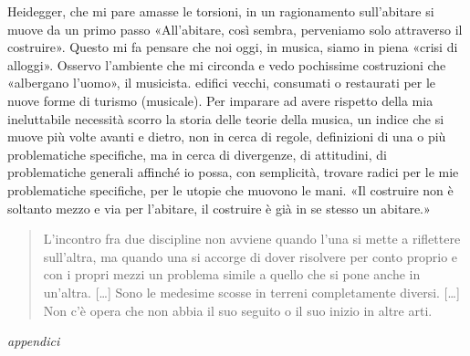 \documentclass{../../lib/gs}
\begin{document}
Heidegger, che mi pare amasse le torsioni, in un ragionamento sull'abitare
\cite{heidegger1991} si muove da un primo passo «All'abitare, così sembra,
perveniamo solo attraverso il costruire». Questo mi fa pensare che noi oggi, in
musica, siamo in piena «crisi di alloggi». Osservo l'ambiente che mi circonda e
vedo pochissime costruzioni che «albergano l'uomo», il musicista. edifici vecchi,
consumati o restaurati per le nuove forme di turismo (musicale). Per imparare
ad avere rispetto della mia ineluttabile necessità scorro la storia delle teorie
della musica, un indice che si muove più volte avanti e dietro, non in cerca di
regole, definizioni di una o più problematiche specifiche, ma in cerca di
divergenze, di attitudini, di problematiche generali affinché io possa, con
semplicità, trovare radici per le mie problematiche specifiche, per le utopie
che muovono le mani. «Il costruire non è soltanto mezzo e via per l'abitare, il
costruire è già in se stesso un abitare.» \cite{heidegger1991}

\begin{quote}
\begin{sf}
\small
  L'incontro fra due discipline non avviene quando l'una si mette a riflettere sull'altra, ma quando una si accorge di dover risolvere per conto proprio e
  con i propri mezzi un problema simile a quello che si pone anche in un'altra.
  [\ldots] Sono le medesime scosse in terreni completamente diversi.
  [\ldots] Non c'è opera che non abbia il suo seguito o il suo inizio in altre
  arti.
  \cite{deleuze2009}
  \end{sf}
\end{quote}

%

\clearpage



\clearpage



\clearpage



\clearpage



\clearpage

\thispagestyle{empty}
\null\vfill
{\Huge\emph{appendici}}
\vfill\null

\clearpage

\appendix
\thispagestyle{empty}



\clearpage
\thispagestyle{plain}
\tableofcontents

\clearpage

\nocite{*}
\printbibliography
\end{document}
